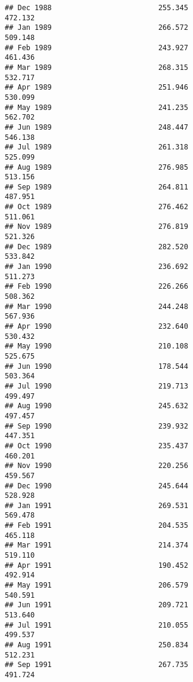 \documentclass[
]{article}
\begin{document}
\begin{verbatim}
## Dec 1988                         255.345                           472.132
## Jan 1989                         266.572                           509.148
## Feb 1989                         243.927                           461.436
## Mar 1989                         268.315                           532.717
## Apr 1989                         251.946                           530.099
## May 1989                         241.235                           562.702
## Jun 1989                         248.447                           546.138
## Jul 1989                         261.318                           525.099
## Aug 1989                         276.985                           513.156
## Sep 1989                         264.811                           487.951
## Oct 1989                         276.462                           511.061
## Nov 1989                         276.819                           521.326
## Dec 1989                         282.520                           533.842
## Jan 1990                         236.692                           511.273
## Feb 1990                         226.266                           508.362
## Mar 1990                         244.248                           567.936
## Apr 1990                         232.640                           530.432
## May 1990                         210.108                           525.675
## Jun 1990                         178.544                           503.364
## Jul 1990                         219.713                           499.497
## Aug 1990                         245.632                           497.457
## Sep 1990                         239.932                           447.351
## Oct 1990                         235.437                           460.201
## Nov 1990                         220.256                           459.567
## Dec 1990                         245.644                           528.928
## Jan 1991                         269.531                           569.478
## Feb 1991                         204.535                           465.118
## Mar 1991                         214.374                           519.110
## Apr 1991                         190.452                           492.914
## May 1991                         206.579                           540.591
## Jun 1991                         209.721                           513.640
## Jul 1991                         210.055                           499.537
## Aug 1991                         250.834                           512.231
## Sep 1991                         267.735                           491.724

\end{verbatim}
\end{document}
